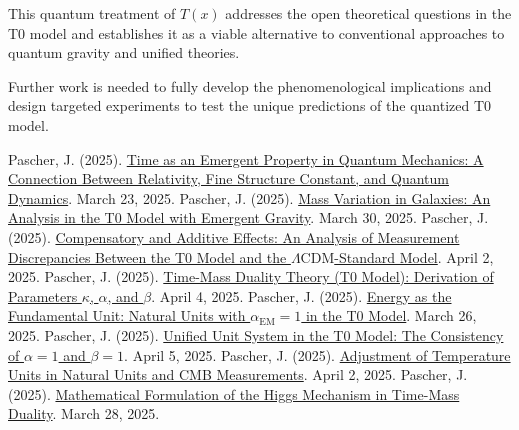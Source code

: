 \documentclass[12pt,a4paper]{article}
\newcommand{\Tfield}{T(x)}
\newcommand{\alphaEM}{\alpha_{\text{EM}}}
\newcommand{\LCDM}{\Lambda\text{CDM}}
\begin{document}
	This quantum treatment of $\Tfield$ addresses the open theoretical questions in the T0 model and establishes it as a viable alternative to conventional approaches to quantum gravity and unified theories.
	
	Further work is needed to fully develop the phenomenological implications and design targeted experiments to test the unique predictions of the quantized T0 model.
	

	
	\begin{thebibliography}{99}
		 Pascher, J. (2025). \href{https://github.com/jpascher/T0-Time-Mass-Duality/tree/main/2/pdf/English/ZeitEmergentQMEn.pdf}{Time as an Emergent Property in Quantum Mechanics: A Connection Between Relativity, Fine Structure Constant, and Quantum Dynamics}. March 23, 2025.
		 Pascher, J. (2025). \href{https://github.com/jpascher/T0-Time-Mass-Duality/tree/main/2/pdf/English/MassVarGalaxienEn.pdf}{Mass Variation in Galaxies: An Analysis in the T0 Model with Emergent Gravity}. March 30, 2025.
		 Pascher, J. (2025). \href{https://github.com/jpascher/T0-Time-Mass-Duality/tree/main/2/pdf/English/MessdifferenzenT0StandardEn.pdf}{Compensatory and Additive Effects: An Analysis of Measurement Discrepancies Between the T0 Model and the \(\LCDM\)-Standard Model}. April 2, 2025.
		 Pascher, J. (2025). \href{https://github.com/jpascher/T0-Time-Mass-Duality/tree/main/2/pdf/English/ZeitMasseT0ParamsEn.pdf}{Time-Mass Duality Theory (T0 Model): Derivation of Parameters \(\kappa\), \(\alpha\), and \(\beta\)}. April 4, 2025.
		 Pascher, J. (2025). \href{https://github.com/jpascher/T0-Time-Mass-Duality/tree/main/2/pdf/English/NatEinheitenAlpha1En.pdf}{Energy as the Fundamental Unit: Natural Units with \(\alphaEM = 1\) in the T0 Model}. March 26, 2025.
		 Pascher, J. (2025). \href{https://github.com/jpascher/T0-Time-Mass-Duality/tree/main/2/pdf/English/Alpha1Beta1KonsistenzEn.pdf}{Unified Unit System in the T0 Model: The Consistency of \(\alpha = 1\) and \(\beta = 1\)}. April 5, 2025.
		 Pascher, J. (2025). \href{https://github.com/jpascher/T0-Time-Mass-Duality/tree/main/2/pdf/English/NatEinheitenAlpha1En.pdf}{Adjustment of Temperature Units in Natural Units and CMB Measurements}. April 2, 2025.
		 Pascher, J. (2025). \href{https://github.com/jpascher/T0-Time-Mass-Duality/tree/main/2/pdf/English/MathHiggsZeitMasseEn.pdf}{Mathematical Formulation of the Higgs Mechanism in Time-Mass Duality}. March 28, 2025.

\end{thebibliography}
\end{document}
